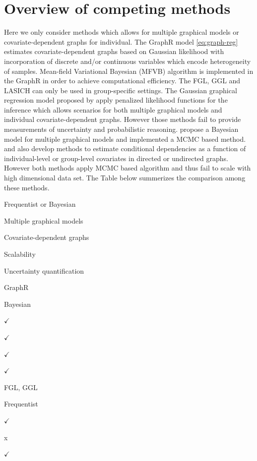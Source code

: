 \documentclass[
]{book}
\begin{document}
\hypertarget{GraphRcompare}{%
\section{Overview of competing methods}\label{GraphRcompare}}

Here we only consider methods which allows for multiple graphical models or covariate-dependent graphs for individual. The GraphR model \eqref{eq:graph-reg} estimates covariate-dependent graphs based on Gaussian likelihood with incorporation of discrete and/or continuous variables which encode heterogeneity of samples. Mean-field Variational Bayesian (MFVB) algorithm is implemented in the GraphR in order to achieve computational efficiency. The FGL, GGL \citep{danaher2014joint} and LASICH \citep{saegusa2016joint} can only be used in group-specific settings. The Gaussian graphical regression model proposed by \citet{zhang2022high} apply penalized likelihood functions for the inference which allows scenarios for both multiple graphical models and individual covariate-dependent graphs. However those methods fail to provide measurements of uncertainty and probabilistic reasoning. \citet{peterson2015bayesian} propose a Bayesian model for multiple graphical models and implemented a MCMC based method. \citet{wang2021bayesian} and \citet{ni2019bayesian} also develop methods to estimate conditional dependencies as a function of individual-level or group-level covariates in directed or undirected graphs. However both methods apply MCMC based algorithm and thus fail to scale with high dimensional data set. The Table below summerizes the comparison among these methods.

Frequentist or Bayesian

Multiple graphical models

Covariate-dependent graphs

Scalability

Uncertainty quantification

GraphR

Bayesian

\(\checkmark\)

\(\checkmark\)

\(\checkmark\)

\(\checkmark\)

FGL, GGL \citep{danaher2014joint}

Frequentist

\(\checkmark\)

x

\(\checkmark\)
\end{document}
